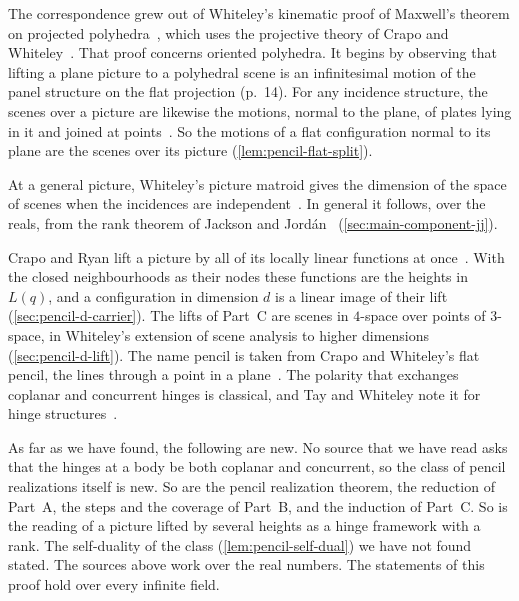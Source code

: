 The correspondence grew out
of Whiteley's kinematic proof of Maxwell's theorem on projected
polyhedra~\cite{whiteley1982}, which uses the projective theory of Crapo
and Whiteley~\cite{crapoWhiteley1982}. That proof concerns oriented
polyhedra. It begins by observing that lifting a plane picture to a
polyhedral scene is an infinitesimal motion of the panel structure on
the flat projection (p.~14). For any incidence structure, the scenes
over a picture are likewise the motions, normal to the plane, of plates
lying in it and joined at points~\cite[\S\S 5.1, 5.3]{whiteley1984}. So
the motions of a flat configuration normal to its plane are the scenes
over its picture (\cref{lem:pencil-flat-split}).

At a general picture,
Whiteley's picture matroid gives the dimension of the space of scenes
when the incidences are independent~\cite[Theorem~3.1, p.~84]{whiteley1989}. In
general it follows, over the reals, from the rank theorem of Jackson and
Jord\'an~\cite[Theorem~7.1]{jacksonJordan2006pin}
(\cref{sec:main-component-jj}).

Crapo and Ryan lift a picture by all of
its locally linear functions at
once~\cite[\S 8, pp.~52--53]{crapoRyan1986}. With the closed
neighbourhoods as their nodes these functions are the heights in $L(q)$,
and a configuration in dimension $d$ is a linear image of their lift
(\cref{sec:pencil-d-carrier}). The lifts of Part~C are scenes in
$4$-space over points of $3$-space, in Whiteley's extension of scene
analysis to higher dimensions~\cite[Definition~7.2]{whiteley1984}
(\cref{sec:pencil-d-lift}). The name pencil is taken from Crapo and
Whiteley's flat pencil, the lines through a point in a
plane~\cite[\S3.5, p.~67]{crapoWhiteley1982}. The polarity that
exchanges coplanar and concurrent hinges is classical, and Tay and
Whiteley note it for hinge structures~\cite[p.~33]{tayWhiteley1984}.

As far as we have found, the following are new. No source that we have
read asks that the hinges at a body be both coplanar and concurrent, so
the class of pencil realizations itself is new. So are the pencil
realization theorem, the reduction of Part~A, the steps and the coverage of Part~B, and the
induction of Part~C. So is the reading of a picture lifted by several
heights as a hinge framework with a rank. The self-duality of the class
(\cref{lem:pencil-self-dual}) we have not found stated. The sources
above work over the real numbers. The statements of this proof hold
over every infinite field.

